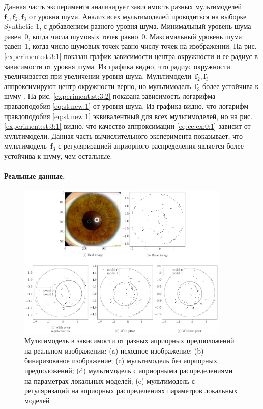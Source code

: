 Данная часть эксперимента анализирует зависимость разных мультимоделей~$\textbf{f}_1, \textbf{f}_2, \textbf{f}_3$ от уровня шума. 
Анализ всех мультимоделей проводиться на выборке Synthetic 1, с добавлением разного уровня шума.
Минимальный уровень шума равен~$0$, когда числа шумовых точек равно~$0$. Максимальный уровень шума равен~$1$, когда число шумовых точек равно числу точек на изображении.
На рис. \ref{experiment:st:3:1} показан график зависимости центра окружности и ее радиус в зависимости от уровня шума. Из графика видно, что радиус окружности увеличивается при увеличении уровня шума. 
Мультимодели~$\textbf{f}_2, \textbf{f}_3$ аппроксимируют центр окружности верно, но мультимодель~$\textbf{f}_3$ более устойчива к шуму .
На рис. \ref{experiment:st:3:2} показана зависимость логарифма правдоподобия \eqref{eq:st:new:1} от уровня шума. 
Из графика видно, что логарифм правдоподобия \eqref{eq:st:new:1} эквивалентный для всех мультимоделей, но на рис. \ref{experiment:st:3:1} видно, что качество аппроксимации \eqref{eq:ce:ex:0:1} зависит от мультимодели.
Данная часть вычислительного эксперимента показывает, что мультимодель~$\textbf{f}_3$ с регуляризацией априорного распределения является более устойчива к шуму, чем остальные.

\paragraph{Реальные данные.}
\begin{figure}[h!t]\center
\includegraphics[width=0.9\textwidth]{results/priorexpert/experiment_real_compare}
\caption{Мультимодель в зависимости от разных априорных предположений на реальном изображении: (a) исходное изображение; (b) бинаризованое изображение; (c) мультимодель без априорных предположений; (d) мультимодель с априорными распределениями на параметрах локальных моделей; (e) мультимодель с регуляризаций на априорных распределениях параметров локальных моделей}
\label{experiment:2}
\end{figure}

